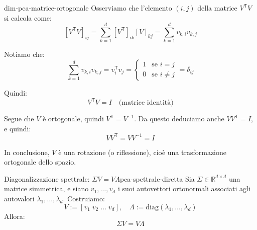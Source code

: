 \begin{dimostrazione}{}{dim-pca-matrice-ortogonale}
Osserviamo che l’elemento \( (i, j) \) della matrice \( V^\mathsf{T} V \) si
calcola come:
\[
[V^\mathsf{T} V]_{ij} = \sum_{k=1}^d [V^\mathsf{T}]_{ik} [V]_{kj}
= \sum_{k=1}^d v_{k,i} v_{k,j}
\]

Notiamo che:
\[
\sum_{k=1}^d v_{k,i} v_{k,j} = v_i^\mathsf{T} v_j =
\begin{cases}
1 & \text{se } i = j \\
0 & \text{se } i \neq j
\end{cases}
= \delta_{ij}
\]

Quindi:
\[
V^\mathsf{T} V = I \quad \text{(matrice identità)}
\]

Segue che \( V \) è ortogonale, quindi \( V^\mathsf{T} = V^{-1} \).
Da questo deduciamo anche \( VV^\mathsf{T} = I \), e quindi:
\[
VV^\mathsf{T} = V V^{-1} = I
\]

In conclusione, \( V \) è una rotazione (o riflessione), cioè una
trasformazione ortogonale dello spazio.
\end{dimostrazione}

\begin{proposizione}{Diagonalizzazione spettrale: \texorpdfstring{\( \Sigma V =
V \Lambda \)}{Sigma V = V Lambda}}{pca-spettrale-diretta}
Sia \( \Sigma \in \mathbb{R}^{d \times d} \) una matrice simmetrica, e siano \(
v_1, \dots, v_d \) i suoi autovettori ortonormali associati agli autovalori \(
\lambda_1, \dots, \lambda_d \). Costruiamo:
\[
V := [v_1 \; v_2 \; \dots \; v_d], \quad \Lambda := \mathrm{diag}(\lambda_1,
\dots, \lambda_d)
\]
Allora:
\[
\Sigma V = V \Lambda
\]
\end{proposizione}

